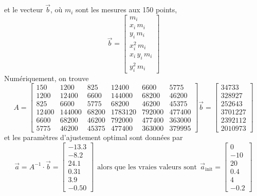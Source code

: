 et le vecteur $\vec{b}$, où $m_i$ sont les mesures aux 150 points,
\begin{equation}
\vec{b}=
\begin{bmatrix}
m_i\\
x_i\,m_i\\
y_i\,m_i\\
x_i^2\,m_i\\
x_i\,y_i\,m_i\\
y_i^2\,m_i
\end{bmatrix}
\end{equation}
Numériquement, on trouve
\begin{equation}
A=
\begin{bmatrix}
    150 &   1200 &   825 &   12400 &   6600 &   5775 \\
   1200 &  12400 &  6600 &  144000 &  68200 &  46200 \\
    825 &   6600 &  5775 &   68200 &  46200 &  45375 \\
  12400 & 144000 & 68200 & 1783120 & 792000 & 477400 \\
   6600 &  68200 & 46200 &  792000 & 477400 & 363000 \\
   5775 &  46200 & 45375 &  477400 & 363000 & 379995
\end{bmatrix}
\vec{b}=
\begin{bmatrix}
  34733 \\
 328927 \\
 252643 \\
3701227 \\
2392112 \\
2010973
\end{bmatrix}
\end{equation}
et les paramètres d'ajustement optimal sont données par
\begin{equation}
\vec{a}=A^{-1}\cdot\vec{b}=
\begin{bmatrix}
-13.3 \\
-8.2 \\
24.1 \\
0.31 \\
3.9 \\
-0.50
\end{bmatrix}
\ \ \text{alors que les vraies valeurs sont}\ \ \vec{a}_{\text{init}}=
\begin{bmatrix}
0 \\
-10 \\
20 \\
0.4 \\
4 \\
-0.2
\end{bmatrix}
\end{equation}
